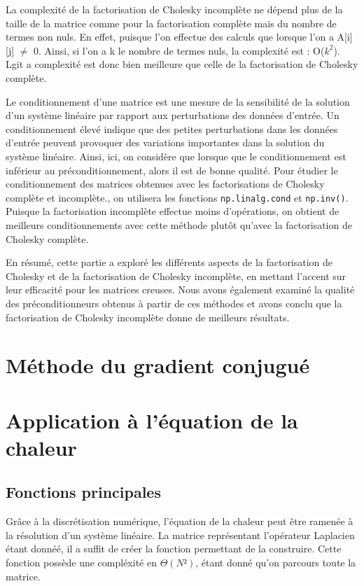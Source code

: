 \documentclass{article}
\begin{document}
La complexité de la factorisation de Cholesky incomplète ne dépend plus de la taille de la matrice comme pour la factorisation complète mais du nombre de termes non nuls. En effet, puisque l'on effectue des calculs que lorsque l'on a A[i][j] $\ne$ 0.
Ainsi, si l'on a k le nombre de termes nuls, la complexité est : O($k^2$). Lgit a complexité est donc bien meilleure que celle de la factorisation de Cholesky complète.

Le conditionnement d'une matrice est une mesure de la sensibilité de la solution d'un système linéaire par rapport aux perturbations des données d'entrée. Un conditionnement élevé indique que des petites perturbations dans les données d'entrée peuvent provoquer des variations importantes dans la solution du système linéaire.
Ainsi, ici, on considère que lorsque que le conditionnement est inférieur au préconditionnement, alors il est de bonne qualité.
Pour étudier le conditionnement des matrices obtenues avec les factorisations de Cholesky complète et incomplète., on utilisera les fonctions \verb|np.linalg.cond| et \verb|np.inv()|.
Puisque la factorisation incomplète effectue moins d'opérations, on obtient de meilleurs conditionnements avec cette méthode plutôt qu'avec la factorisation de Cholesky complète.

En résumé, cette partie a exploré les différents aspects de la factorisation de Cholesky et de la factorisation de Cholesky incomplète, en mettant l'accent sur leur efficacité pour les matrices creuses. 
Nous avons également examiné la qualité des préconditionneurs obtenus à partir de ces méthodes et avons conclu que la factorisation de Cholesky incomplète donne de meilleurs résultats.
\section{Méthode du gradient conjugué}
\label{sec:meth_grad_conj}

\section{Application à l'équation de la chaleur}
\label{sec:eq_chaleur}

\subsection{Fonctions principales}
\label{ssec:fonc_princ}
Grâce à la discrétisation numérique, l'équation de la chaleur peut être ramenée à la résolution d'un système linéaire. 
La matrice représentant l'opérateur Laplacien étant donnéé, il a suffit de créer la fonction permettant de la construire.
Cette fonction possède une compléxité en $\Theta(N²)$, étant donné qu'on parcours toute la matrice.
\end{document}
